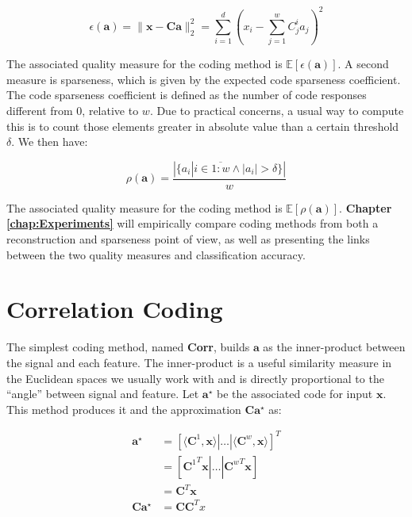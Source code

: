 \documentclass[12pt,a4paper,oneside,english]{UPBThesis}
\newcommand{\hcrange}[2]{\overline{{#1}\colon\!\!{#2}}}
\begin{document}
\begin{equation*}
\epsilon(\textbf{a}) = \| \textbf{x} - \textbf{C}\textbf{a} \|_2^2 = \sum_{i=1}^d {( x_i - \sum_{j=1}^w {C_j^i a_j})^2}
\end{equation*}

The associated quality measure for the coding method is $\mathbb{E} [ \epsilon(\textbf{a}) ]$. A second measure is sparseness, which is given by the expected code sparseness coefficient. The code sparseness coefficient is defined as the number of code responses different from $0$, relative to $w$. Due to practical concerns, a usual way to compute this is to count those elements greater in absolute value than a certain threshold $\delta$. We then have:

\begin{equation*}
\rho(\textbf{a}) = \frac{\left| \{ a_i \left|\right. i \in \hcrange{1}{w} \wedge \left|a_i\right| > \delta \} \right|}{w}
\end{equation*}

The associated quality measure for the coding method is $\mathbb{E} [ \rho(\textbf{a}) ]$. \textbf{Chapter \ref{chap:Experiments}} will empirically compare coding methods from both a reconstruction and sparseness point of view, as well as presenting the links between the two quality measures and classification accuracy.

\section{Correlation Coding}
\label{sec:CorrelationCoding}

The simplest coding method, named \textbf{Corr}, builds $\textbf{a}$ as the inner-product between the signal and each feature. The inner-product is a useful similarity measure in the Euclidean spaces we usually work with and is directly proportional to the ``angle'' between signal and feature. Let $\textbf{a}^\star$ be the associated code for input $\textbf{x}$. This method produces it and the approximation $\textbf{C}\textbf{a}^\star$ as:

\begin{align*}
\textbf{a}^\star & = [ \langle \textbf{C}^1, \textbf{x} \rangle \left|\right. \dots \left|\right. \langle \textbf{C}^w, \textbf{x} \rangle ]^T \\
& = [ {\textbf{C}^1}^T\textbf{x} \left|\right. \dots \left|\right. {\textbf{C}^w}^T\textbf{x} ] \\
& = \textbf{C}^T\textbf{x} \\
\textbf{C}\textbf{a}^\star & = \textbf{C}\textbf{C}^Tx
\end{align*}
\end{document}
